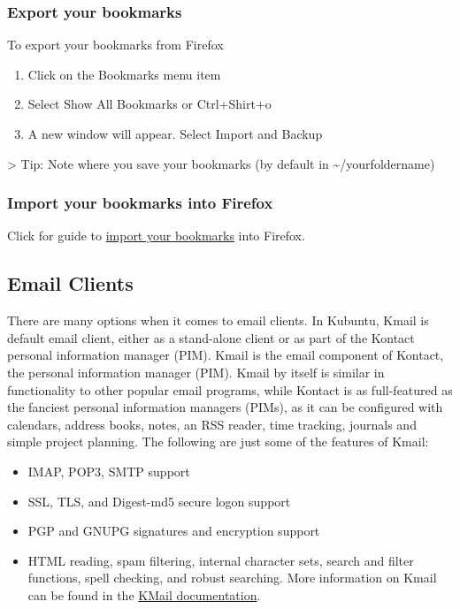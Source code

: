 \documentclass[letterpaper,10pt,english]{sphinxmanual}
\begin{document}
\subsubsection{Export your bookmarks}
\label{\detokenize{docs/software:export-your-bookmarks}}
To export your bookmarks from Firefox
\begin{enumerate}
\item {} 
Click on the Bookmarks menu item

\item {} 
Select Show All Bookmarks or Ctrl+Shirt+o

\item {} 
A new window will appear. Select Import and Backup

\end{enumerate}

\textgreater{} Tip: Note where you save your bookmarks (by default in \textasciitilde{}/yourfoldername)


\subsubsection{Import your bookmarks into Firefox}
\label{\detokenize{docs/software:import-your-bookmarks-into-firefox}}
Click for guide to \href{https://support.mozilla.org/en-US/kb/import-bookmarks-html-file}{import your bookmarks} into Firefox.


\subsection{Email Clients}
\label{\detokenize{docs/software:email-clients}}
There are many options when it comes to email clients. In Kubuntu, Kmail is default email client, either as a stand-alone client or as part of the Kontact personal information manager (PIM). Kmail is the email component of Kontact, the  personal information manager (PIM). Kmail by itself is similar in functionality to other popular email programs, while Kontact is as full-featured as the fanciest personal information managers (PIMs), as it can be configured with calendars, address books, notes, an RSS reader, time tracking, journals and simple project planning. The following are just some of the features of Kmail:
\begin{itemize}
\item {} 
IMAP, POP3, SMTP support

\item {} 
SSL, TLS, and Digest-md5 secure logon support

\item {} 
PGP and GNUPG signatures and encryption support

\item {} 
HTML reading, spam filtering, internal character sets, search and filter functions, spell checking, and robust searching. More information on Kmail can be found in the \href{https://userbase.kde.org/Special:MyLanguage/KMail}{KMail documentation}.

\end{itemize}
\end{document}
